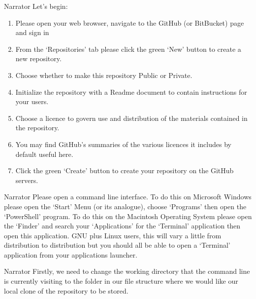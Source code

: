 \documentclass{screenplay} %
\begin{document}
\begin{dialogue}{Narrator} Let's begin: \begin{enumerate}
\item Please open your web browser, navigate to the GitHub (or BitBucket) page and sign in
\item From the `Repositories' tab please click the green `New' button to create a new repository.
\item Choose whether to make this repository Public or Private.
\item Initialize the repository with a Readme document to contain instructions for your users.
\item Choose a licence to govern use and distribution of the materials contained in the repository.
\item You may find GitHub's summaries of the various licences it includes by default useful here.
\item Click the green `Create' button to create your repository on the GitHub servers.
\end{enumerate}
\end{dialogue}

\begin{dialogue}{Narrator}
Please open a command line interface.
\newline
\newline
To do this on Microsoft Windows please open the `Start' Menu (or its analogue), choose `Programs' then open the `PowerShell' program.
\newline
\newline
To do this on the Macintosh Operating System please open the `Finder' and search your `Applications' for the `Terminal' application then open this application.
\newline
\newline
GNU plus Linux users, this will vary a little from distribution to distribution but you should all be able to open a `Terminal' application from your applications launcher.
\end{dialogue}

\begin{dialogue}{Narrator}
Firstly, we need to change the working directory that the command line is currently visiting to the folder in our file structure where we would like our local clone of the repository to be stored.
\end{dialogue}
\end{document}

